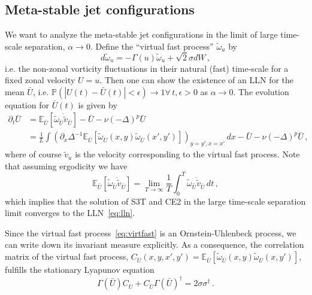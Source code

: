 \documentclass[12pt]{amsart}
\def\EE{\mathbb{E}}\def\PP{\mathbb{P}}
\begin{document}
\subsection{Meta-stable jet configurations}

We want to analyze the meta-stable jet configurations in the limit of
large time-scale separation, $\alpha\to0$. Define the ``virtual fast
process'' $\tilde\omega_u$ by
\begin{equation}
  \label{eq:virtfast}
  d\tilde\omega_u = -\Gamma(u)\tilde\omega_u + \sqrt{2}\sigma dW\,,
\end{equation}
i.e. the non-zonal vorticity fluctuations in their natural (fast)
time-scale for a fixed zonal velocity $U=u$. Then one can show the
existence of an LLN for the mean $\bar U$, i.e. ${\PP(|U(t)-\bar
  U(t)|<\epsilon)\to1} \forall \,t,\epsilon>0$ as $\alpha\to0$. The
evolution equation for $\bar U(t)$ is given by
\begin{equation}
  \label{eq:lln}
  \begin{aligned}
    \partial_t \bar U &= \EE_{\bar U}\left[\overline{\tilde\omega_{\bar U} \tilde v_{\bar U}}\right] -\bar U - \nu (-\Delta)^p \bar U\\
    &= \frac1L\int \left(\partial_x \Delta^{-1} \EE_{\bar U}\left[\tilde\omega_{\bar U}(x,y)\tilde\omega_{\bar U}(x',y')\right]\right)_{y=y',x=x'} \,dx -\bar U - \nu (-\Delta)^p \bar U\,,
  \end{aligned}
\end{equation}
where of course $\tilde v_u$ is the velocity corresponding to the
virtual fast process. Note that assuming ergodicity we have
\begin{equation*}
  \EE_{\bar U}\left[\overline{\tilde\omega_{\bar U} \tilde v_{\bar U}}\right] = \lim_{T\to\infty}\frac1T \int_0^T \overline{\tilde\omega_{\bar U} \tilde v_{\bar U}}\,dt\,,
\end{equation*}
which implies that the solution of S3T and CE2 in the large time-scale
separation limit converges to the LLN~\eqref{eq:lln}.

Since the virtual fast process~\eqref{eq:virtfast} is an
Ornstein-Uhlenbeck process, we can write down its invariant measure
explicitly. As a consequence, the correlation matrix of the virtual
fast process, $C_{\bar U}(x,y,x',y')=\EE_{\bar U}\left[\tilde\omega_{\bar U}(x,y)
  \tilde \omega_{\bar U}(x,y')\right]$, fulfills the stationary
Lyapunov equation
\begin{equation}
  \label{eq:lyapunov}
  \Gamma(\bar U) C_{\bar U} + C_{\bar U} \Gamma(\bar U)^\dagger = 2
  \sigma \sigma^\dagger\,.
\end{equation}
\end{document}
